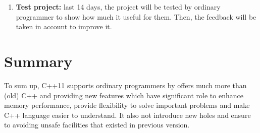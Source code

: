 \documentclass[11pt]{report}
\begin{document}
\begin{enumerate}
\item \textbf{Test project:} last 14 days, the project will be tested by ordinary \linebreak programmer to show how much it useful for them. Then, the feedback will  be taken in account to improve it.

\end{enumerate}



\section{Summary}
\label{section: summary}

To sum up, C++11 supports ordinary programmers by offers much more than (old) C++  and  providing new features which have significant role to enhance memory performance, provide flexibility to solve important problems and make C++ language easier to understand. It also not introduce new holes and  ensure to avoiding unsafe facilities that existed in previous version.


	
\end{document}
